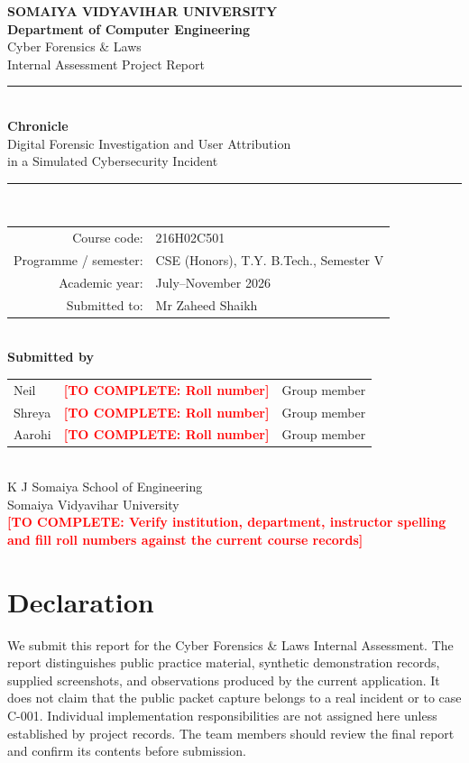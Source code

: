 \documentclass[12pt,a4paper]{report}
\newcommand{\todo}[1]{\textcolor{red}{\textbf{[TO COMPLETE: #1]}}}
\begin{document}
\begin{titlepage}
\begin{center}
\vspace*{12mm}
{\Large\bfseries SOMAIYA VIDYAVIHAR UNIVERSITY}\\[3mm]
{\large\bfseries Department of Computer Engineering}\\[18mm]
{\Large Cyber Forensics \& Laws}\\[2mm]
{\large Internal Assessment Project Report}\\[17mm]
\rule{\textwidth}{1.2pt}\\[5mm]
{\Huge\bfseries Chronicle}\\[3mm]
{\LARGE Digital Forensic Investigation and User Attribution\\in a Simulated Cybersecurity Incident}\\[5mm]
\rule{\textwidth}{1.2pt}\\[16mm]
\begin{tabular}{rl}
Course code: & 216H02C501\\
Programme / semester: & CSE (Honors), T.Y. B.Tech., Semester V\\
Academic year: & July--November 2026\\
Submitted to: & Mr Zaheed Shaikh\\
\end{tabular}\\[14mm]
\textbf{Submitted by}\\[4mm]
\begin{tabular}{lll}
Neil & \todo{Roll number} & Group member\\
Shreya & \todo{Roll number} & Group member\\
Aarohi & \todo{Roll number} & Group member\\
\end{tabular}\\[14mm]
{\large K J Somaiya School of Engineering}\\
{\large Somaiya Vidyavihar University}\\[8mm]
\todo{Verify institution, department, instructor spelling and fill roll numbers against the current course records}
\end{center}
\end{titlepage}

\chapter*{Declaration}
We submit this report for the Cyber Forensics \& Laws Internal Assessment. The report distinguishes public practice material, synthetic demonstration records, supplied screenshots, and observations produced by the current application. It does not claim that the public packet capture belongs to a real incident or to case C-001. Individual implementation responsibilities are not assigned here unless established by project records. The team members should review the final report and confirm its contents before submission.
\end{document}
